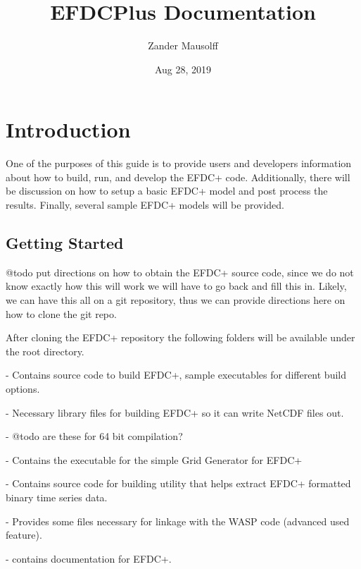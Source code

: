 \documentclass[letterpaper,10pt,english]{sphinxmanual}
\title{EFDCPlus Documentation}
\date{Aug 28, 2019}
\author{Zander Mausolff}
\begin{document}
\pagestyle{empty}
\sphinxmaketitle
\pagestyle{plain}
\sphinxtableofcontents
\pagestyle{normal}
\label{\detokenize{index::doc}}



\chapter{Introduction}
\label{\detokenize{index:introduction}}
One of the purposes of this guide is to provide users and developers information about how to build, run, and develop the EFDC+ code.  Additionally, there will be discussion on how to setup a basic EFDC+ model and post process the results. Finally, several sample EFDC+ models will be provided.


\section{Getting Started}
\label{\detokenize{started/index:getting-started}}\label{\detokenize{started/index:started}}\label{\detokenize{started/index::doc}}
@todo put directions on how to obtain the EFDC+ source code, since we do not know exactly how this will work we will have to go back and fill this in.
Likely, we can have this all on a git repository, thus we can provide directions here on how to clone the git repo.

After cloning the EFDC+ repository the following folders will be available under the root directory.

 - Contains source code to build EFDC+, sample executables for different build options.

 - Necessary library files for building EFDC+ so it can write NetCDF files out.

 - @todo are these for 64 bit compilation?

 - Contains the executable for the simple Grid Generator for EFDC+

 - Contains source code for building utility that helps extract EFDC+ formatted binary time series data.

 - Provides some files necessary for linkage with the WASP code (advanced used feature).

 - contains documentation for EFDC+.
\end{document}

